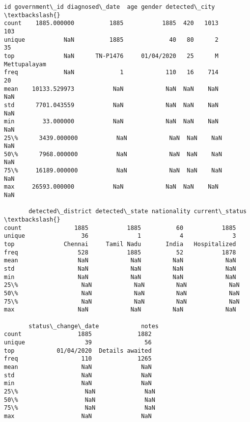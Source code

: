 \documentclass[11pt]{article}
\newcommand{\prompt}[4]{
        \llap{{\color{#2}[#3]: #4}}\vspace{-1.25em}
    }
\begin{document}
            \begin{tcolorbox}[breakable, boxrule=.5pt, size=fbox, pad at break*=1mm, opacityfill=0]
\prompt{Out}{outcolor}{99}{\hspace{3.5pt}}
\begin{Verbatim}[commandchars=\\\{\}]
                  id government\_id diagnosed\_date  age gender detected\_city  \textbackslash{}
count    1885.000000          1885           1885  420   1013           103
unique           NaN          1885             40   80      2            35
top              NaN      TN-P1476     01/04/2020   25      M  Mettupalayam
freq             NaN             1            110   16    714            20
mean    10133.529973           NaN            NaN  NaN    NaN           NaN
std      7701.043559           NaN            NaN  NaN    NaN           NaN
min        33.000000           NaN            NaN  NaN    NaN           NaN
25\%      3439.000000           NaN            NaN  NaN    NaN           NaN
50\%      7968.000000           NaN            NaN  NaN    NaN           NaN
75\%     16189.000000           NaN            NaN  NaN    NaN           NaN
max     26593.000000           NaN            NaN  NaN    NaN           NaN

       detected\_district detected\_state nationality current\_status  \textbackslash{}
count               1885           1885          60           1885
unique                36              1           4              3
top              Chennai     Tamil Nadu       India   Hospitalized
freq                 528           1885          52           1878
mean                 NaN            NaN         NaN            NaN
std                  NaN            NaN         NaN            NaN
min                  NaN            NaN         NaN            NaN
25\%                  NaN            NaN         NaN            NaN
50\%                  NaN            NaN         NaN            NaN
75\%                  NaN            NaN         NaN            NaN
max                  NaN            NaN         NaN            NaN

       status\_change\_date            notes
count                1885             1882
unique                 39               56
top            01/04/2020  Details awaited
freq                  110             1265
mean                  NaN              NaN
std                   NaN              NaN
min                   NaN              NaN
25\%                   NaN              NaN
50\%                   NaN              NaN
75\%                   NaN              NaN
max                   NaN              NaN
\end{Verbatim}
\end{tcolorbox}
        
\end{document}
